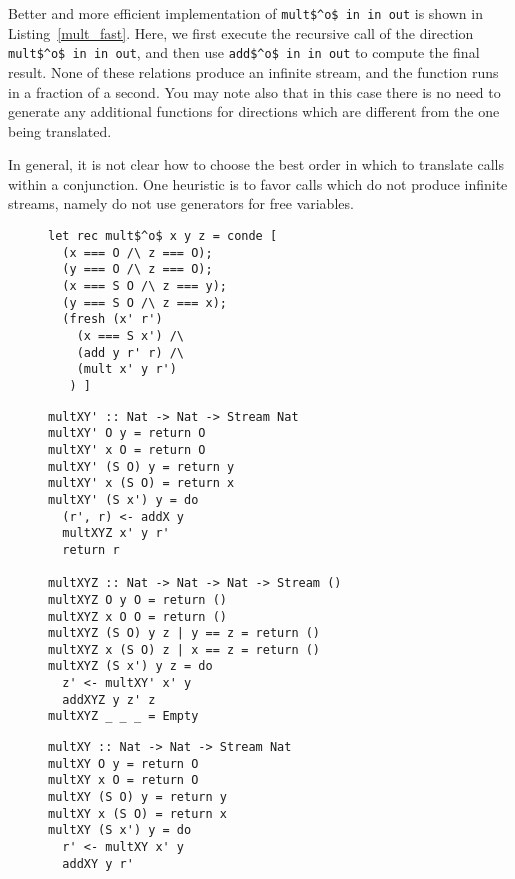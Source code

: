 Better and more efficient implementation of \lstinline{mult$^o$ in in out} is shown in Listing~\ref{mult_fast}.
Here, we first execute the recursive call of the direction \lstinline{mult$^o$ in in out}, and then use \lstinline{add$^o$ in in out} to compute the final result.
None of these relations produce an infinite stream, and the function runs in a fraction of a second.
You may note also that in this case there is no need to generate any additional functions for directions which are different from the one being translated.

In general, it is not clear how to choose the best order in which to translate calls within a conjunction.
One heuristic is to favor calls which do not produce infinite streams, namely do not use generators for free variables.

\begin{figure}[!t]
  \centering
  \begin{minipage}{\columnwidth}
    \begin{lstlisting}[label={mult}, caption={Multiplication relation}, captionpos=b, frame=tb]
let rec mult$^o$ x y z = conde [
  (x === O /\ z === O);
  (y === O /\ z === O);
  (x === S O /\ z === y);
  (y === S O /\ z === x);
  (fresh (x' r')
    (x === S x') /\
    (add y r' r) /\
    (mult x' y r')
   ) ]
    \end{lstlisting}
  \end{minipage}
\end{figure}

\begin{figure}[!t]
  \centering
  \begin{minipage}{\columnwidth}
    \begin{lstlisting}[label={mult_slow}, caption={Inefficient implementation of \lstinline{multo in in out} direciton}, captionpos=b, frame=tb]
multXY' :: Nat -> Nat -> Stream Nat
multXY' O y = return O
multXY' x O = return O
multXY' (S O) y = return y
multXY' x (S O) = return x
multXY' (S x') y = do
  (r', r) <- addX y
  multXYZ x' y r'
  return r

multXYZ :: Nat -> Nat -> Nat -> Stream ()
multXYZ O y O = return ()
multXYZ x O O = return ()
multXYZ (S O) y z | y == z = return ()
multXYZ x (S O) z | x == z = return ()
multXYZ (S x') y z = do
  z' <- multXY' x' y
  addXYZ y z' z
multXYZ _ _ _ = Empty
    \end{lstlisting}
  \end{minipage}
\end{figure}

\begin{figure}[!t]
  \centering
  \begin{minipage}{\columnwidth}
    \begin{lstlisting}[label={mult_fast}, caption={Efficient implementation of \lstinline{multo in in out} direciton}, captionpos=b, frame=tb]
multXY :: Nat -> Nat -> Stream Nat
multXY O y = return O
multXY x O = return O
multXY (S O) y = return y
multXY x (S O) = return x
multXY (S x') y = do
  r' <- multXY x' y
  addXY y r'
    \end{lstlisting}
  \end{minipage}
\end{figure}
